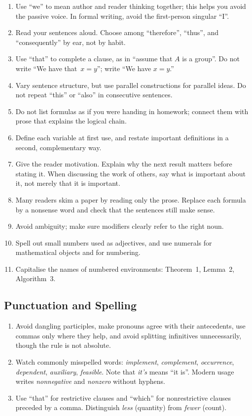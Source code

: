 \documentclass[11pt]{article}
\begin{document}
\begin{enumerate}[label=\arabic*., start=9, leftmargin=*]
  \item Use ``we'' to mean author and reader thinking together; this helps you avoid the passive voice. In formal writing, avoid the first-person singular ``I''.
  \item Read your sentences aloud. Choose among ``therefore'', ``thus'', and ``consequently'' by ear, not by habit.
  \item Use ``that'' to complete a clause, as in ``assume that $A$ is a group''. Do not write ``We have that~$x=y$''; write ``We have $x=y$.''
  \item Vary sentence structure, but use parallel constructions for parallel ideas. Do not repeat ``this'' or ``also'' in consecutive sentences.
  \item Do not list formulas as if you were handing in homework; connect them with prose that explains the logical chain.
  \item Define each variable at first use, and restate important definitions in a second, complementary way.
  \item Give the reader motivation. Explain why the next result matters before stating it. When discussing the work of others, say what is important about it, not merely that it is important.
  \item Many readers skim a paper by reading only the prose. Replace each formula by a nonsense word and check that the sentences still make sense.
  \item Avoid ambiguity; make sure modifiers clearly refer to the right noun.
  \item Spell out small numbers used as adjectives, and use numerals for mathematical objects and for numbering.
  \item Capitalise the names of numbered environments: Theorem~1, Lemma~2, Algorithm~3.
\end{enumerate}

\subsection{Punctuation and Spelling}

\begin{enumerate}[label=\arabic*., start=20, leftmargin=*]
  \item Avoid dangling participles, make pronouns agree with their antecedents, use commas only where they help, and avoid splitting infinitives unnecessarily, though the rule is not absolute.
  \item Watch commonly misspelled words: \emph{implement}, \emph{complement}, \emph{occurrence}, \emph{dependent}, \emph{auxiliary}, \emph{feasible}. Note that \emph{it's} means ``it is''. Modern usage writes \emph{nonnegative} and \emph{nonzero} without hyphens.
  \item Use ``that'' for restrictive clauses and ``which'' for nonrestrictive clauses preceded by a comma. Distinguish \emph{less} (quantity) from \emph{fewer} (count).
\end{enumerate}
\end{document}
